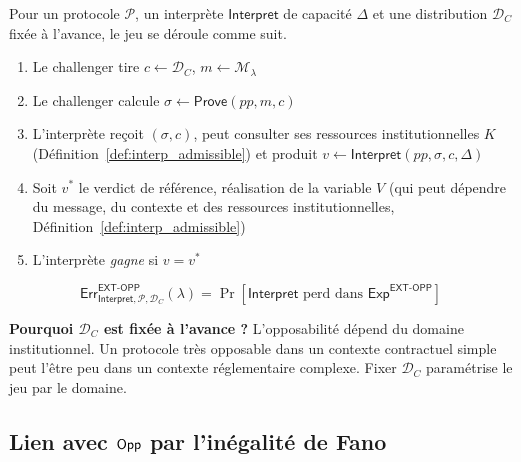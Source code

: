 \begin{sloppypar}
\begin{definition}\label{def:ann_ext_opp}
Pour un protocole $\mathcal{P}$, un interprète $\mathsf{Interpret}$
de capacité $\Delta$ et une distribution $\mathcal{D}_C$ fixée à l'avance, le jeu se d\'eroule comme suit.
\begin{enumerate}
\item Le challenger tire $c \leftarrow \mathcal{D}_C$,
      $m \leftarrow \mathcal{M}_\lambda$
\item Le challenger calcule $\sigma \leftarrow \mathsf{Prove}(pp,m,c)$
\item L'interprète reçoit $(\sigma,c)$, peut consulter ses ressources
      institutionnelles $K$ (D\'efinition~\ref{def:interp_admissible}) et produit
      $v \leftarrow \mathsf{Interpret}(pp,\sigma,c,\Delta)$
\item Soit $v^*$ le verdict de r\'ef\'erence, r\'ealisation de la variable $V$
      (qui peut d\'ependre du message, du contexte et des ressources
      institutionnelles, D\'efinition~\ref{def:interp_admissible})
\item L'interprète \emph{gagne} si $v = v^*$
\end{enumerate}
\begin{equation}
\mathsf{Err}^{\mathsf{EXT\text{-}OPP}}_{\mathsf{Interpret},\mathcal{P},\mathcal{D}_C}(\lambda)
= \Pr\!\left[
\mathsf{Interpret} \text{ perd dans }
\mathsf{Exp}^{\mathsf{EXT\text{-}OPP}}\right]
\end{equation}
\end{definition}

\noindent\textbf{Pourquoi $\mathcal{D}_C$ est fix\'ee \`a l'avance ?}
L'opposabilit\'e d\'epend du domaine institutionnel. Un protocole tr\`es
opposable dans un contexte contractuel simple peut l'\^etre peu dans un
contexte r\'eglementaire complexe. Fixer $\mathcal{D}_C$ param\'etrise le
jeu par le domaine.

\subsection{Lien avec $\mathsf{Opp}$ par l'in\'egalit\'e de Fano}


\end{sloppypar}
